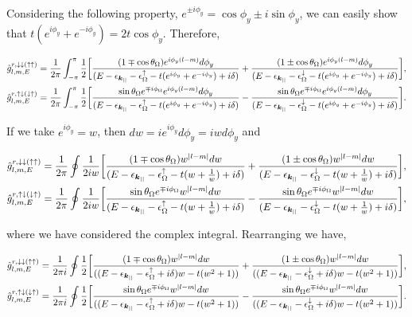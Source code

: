 \documentclass[10pt,prb,showpacs,amssymb,floatfix]{revtex4-1}
\newcommand{\dna}{\downarrow}
\newcommand{\upa}{\uparrow}
\newcommand{\dlt}{\delta}
\newcommand{\eps}{\epsilon}
\newcommand{\Og}{\Omega}
\begin{document}
Considering the following property, $e^{\pm i\phi_y} = \cos\phi_y \pm i \sin\phi_y$, we can easily show that $t(e^{i\phi_y} + e^{-i\phi_y}) = 2t\cos\phi_y$. Therefore,


\begin{align}
\hat{g}^{r, \dna\dna (\upa\upa)}_{l,m,E} &= \frac{1}{2\pi}\int_{-\pi}^{\pi} \frac{1}{2} \bigg{[}   \frac{(1\mp\cos\theta_\Og) e^{i\phi_y(l-m)}d\phi_y}{(E-\eps_{\bm{k}_{||}}- \eps_\Og^\upa   - t(e^{i\phi_y} + e^{-i\phi_y})  + i\dlt)}+ \frac{(1\pm\cos\theta_\Og) e^{i\phi_y(l-m)}d\phi_y}{(E-\eps_{\bm{k}_{||}}- \eps_\Og^\dna   - t(e^{i\phi_y} + e^{-i\phi_y})  + i\dlt)} \bigg{]},  \\
\hat{g}^{r, \upa\dna(\dna\upa)}_{l, m, E}  &=\frac{1}{2\pi} \int_{-\pi}^{\pi} \frac{1}{2} \bigg{[}\frac{ \sin\theta_\Og e^{\mp i\phi_\Og} e^{i\phi_y(l-m)}d\phi_y}{ (E-\eps_{\bm{k}_{||}} -\eps_\Og^\upa  -t(e^{i\phi_y} + e^{-i\phi_y})  + i\dlt) } - \frac{ \sin\theta_\Og e^{\mp i\phi_\Og} e^{i\phi_y(l-m)}d\phi_y}{(E-\eps_{\bm{k}_{||}} -\eps^\dna_\Og  -t(e^{i\phi_y} + e^{-i\phi_y})  + i\dlt)}\bigg{]}.
\end{align}

If we take $e^{i\phi_y} = w$, then $dw = i e^{i\phi_y} d\phi_y = iwd\phi_y$ and

\begin{align}
\hat{g}^{r, \dna\dna (\upa\upa)}_{l,m,E} &= \frac{1}{2\pi}\oint \frac{1}{2iw} \bigg{[}   \frac{(1\mp\cos\theta_\Og) w^{|l-m|}dw}{(E-\eps_{\bm{k}_{||}}- \eps_\Og^\upa   - t(w + \frac{1}{w})  + i\dlt)}+ \frac{(1\pm\cos\theta_\Og) w^{|l-m|}dw}{(E-\eps_{\bm{k}_{||}}- \eps_\Og^\dna   - t(w + \frac{1}{w})  + i\dlt)} \bigg{]},  \\
\hat{g}^{r, \upa\dna(\dna\upa)}_{l, m, E}  &=\frac{1}{2\pi} \oint \frac{1}{2iw} \bigg{[}\frac{ \sin\theta_\Og e^{\mp i\phi_\Og} w^{|l-m|}dw}{ (E-\eps_{\bm{k}_{||}} -\eps_\Og^\upa  -t(w + \frac{1}{w})  + i\dlt) } - \frac{ \sin\theta_\Og e^{\mp i\phi_\Og} w^{|l-m|}dw}{(E-\eps_{\bm{k}_{||}} -\eps^\dna_\Og  -t(w + \frac{1}{w})  + i\dlt)}\bigg{]},
\end{align}

where we have considered the complex integral. Rearranging we have,

\begin{align}
\hat{g}^{r, \dna\dna (\upa\upa)}_{l,m,E} &= \frac{1}{2\pi i}\oint \frac{1}{2} \bigg{[}   \frac{(1\mp\cos\theta_\Og) w^{|l-m|}dw}{((E-\eps_{\bm{k}_{||}}- \eps_\Og^\upa + i\dlt) w   - t(w^2 + 1) )}+ \frac{(1\pm\cos\theta_\Og) w^{|l-m|}dw}{((E-\eps_{\bm{k}_{||}}- \eps_\Og^\dna + i\dlt)w   - t(w^2 + 1) )} \bigg{]},  \\
\hat{g}^{r, \upa\dna(\dna\upa)}_{l, m, E}  &=\frac{1}{2\pi i} \oint \frac{1}{2} \bigg{[}\frac{ \sin\theta_\Og e^{\mp i\phi_\Og} w^{|l-m|}dw}{ ((E-\eps_{\bm{k}_{||}} -\eps_\Og^\upa + i\dlt)w   -t(w^2 + 1) ) } - \frac{ \sin\theta_\Og e^{\mp i\phi_\Og} w^{|l-m|}dw}{((E-\eps_{\bm{k}_{||}} -\eps^\dna_\Og + i\dlt)w -t(w^2 + 1)  )}\bigg{]}.
\end{align}
\end{document}
